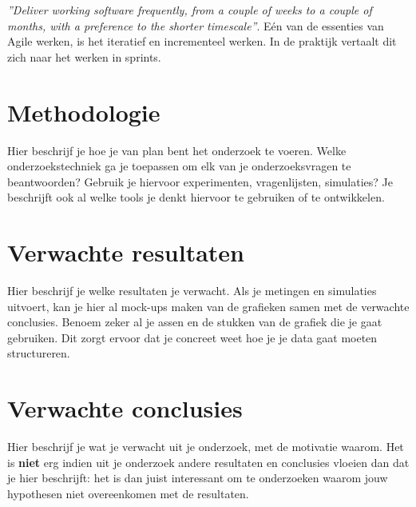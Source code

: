 \emph{''Deliver working software frequently, from a
couple of weeks to a couple of months, with a
preference to the shorter timescale''}\autocite{Beck2001}. Eén van de essenties van Agile werken, is het iteratief en incrementeel werken. In de praktijk vertaalt dit zich naar het werken in sprints.




\section{Methodologie}
\label{sec:methodologie}

Hier beschrijf je hoe je van plan bent het onderzoek te voeren. Welke onderzoekstechniek ga je toepassen om elk van je onderzoeksvragen te beantwoorden? Gebruik je hiervoor experimenten, vragenlijsten, simulaties? Je beschrijft ook al welke tools je denkt hiervoor te gebruiken of te ontwikkelen.

\section{Verwachte resultaten}
\label{sec:verwachte_resultaten}

Hier beschrijf je welke resultaten je verwacht. Als je metingen en simulaties uitvoert, kan je hier al mock-ups maken van de grafieken samen met de verwachte conclusies. Benoem zeker al je assen en de stukken van de grafiek die je gaat gebruiken. Dit zorgt ervoor dat je concreet weet hoe je je data gaat moeten structureren.

\section{Verwachte conclusies}
\label{sec:verwachte_conclusies}

Hier beschrijf je wat je verwacht uit je onderzoek, met de motivatie waarom. Het is \textbf{niet} erg indien uit je onderzoek andere resultaten en conclusies vloeien dan dat je hier beschrijft: het is dan juist interessant om te onderzoeken waarom jouw hypothesen niet overeenkomen met de resultaten.

